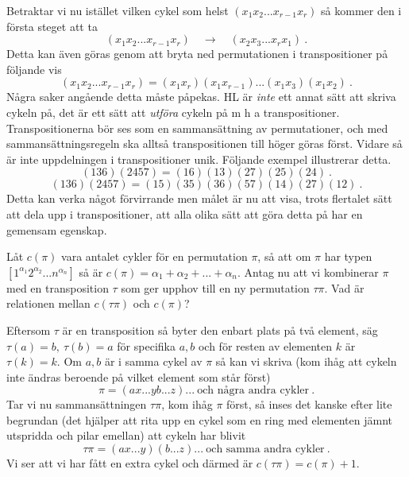 \documentclass{article}
\begin{document}
Betraktar vi nu istället vilken cykel som helst $(x_1x_2...x_{r-1}x_r)$ så kommer den i första steget att ta
$$
(x_1x_2...x_{r-1}x_r) \quad \rightarrow \quad (x_2x_3...x_rx_1) \ .
$$
Detta kan även göras genom att bryta ned permutationen i transpositioner på följande vis
$$
(x_1x_2...x_{r-1}x_r)=(x_1x_r)(x_1x_{r-1})...(x_1x_3)(x_1x_2) \ .
$$
Några saker angående detta måste påpekas. HL är \textit{inte} ett annat sätt att skriva cykeln på, det är ett sätt att \textit{utföra} cykeln på m h a transpositioner. Transpositionerna bör ses som en sammansättning av permutationer, och med sammansättningsregeln ska alltså transpositionen till höger göras först. Vidare så är inte uppdelningen i transpositioner unik. Följande exempel illustrerar detta. 
$$
(136)(2457)=(16)(13)(27)(25)(24) \ .
$$
$$
(136)(2457)=(15)(35)(36)(57)(14)(27)(12) \ .
$$
Detta kan verka något förvirrande men målet är nu att visa, trots flertalet sätt att dela upp i transpositioner, att alla olika sätt att göra detta på har en gemensam egenskap.

Låt $c(\pi)$ vara antalet cykler för en permutation $\pi$, så att om $\pi$ har typen $[1^{\alpha_1}2^{\alpha_2}...n^{\alpha_n}]$ så är $c(\pi)=\alpha_1+\alpha_2+...+\alpha_n$. Antag nu att vi kombinerar $\pi$ med en transposition $\tau$ som ger upphov till en ny permutation $\tau\pi$. Vad är relationen mellan $c(\tau\pi)$ och $c(\pi)$?

Eftersom $\tau$ är en transposition så byter den enbart plats på två element, säg $\tau(a)=b, \ \tau(b)=a$ för specifika $a,b$ och för resten av elementen $k$ är $\tau(k)=k$. Om $a,b$ är i samma cykel av $\pi$ så kan vi skriva (kom ihåg att cykeln inte ändras beroende på vilket element som står först) 
$$
\pi=(ax...yb...z)... \  \textrm{och några andra cykler} \ . 
$$
Tar vi nu sammansättningen $\tau\pi$, kom ihåg $\pi$ först, så inses det kanske efter lite begrundan (det hjälper att rita upp en cykel som en ring med elementen jämnt utspridda och pilar emellan) att cykeln har blivit
$$
\tau\pi=(ax...y)(b...z)... \ \textrm{och samma andra cykler} \ .
$$
Vi ser att vi har fått en extra cykel och därmed är $c(\tau\pi)=c(\pi)+1$.
\end{document}
